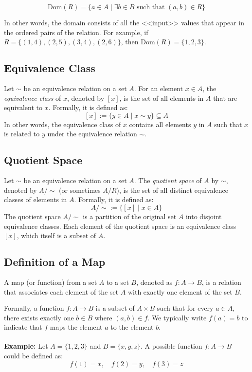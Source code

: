 \[\text{Dom}(R) = \{a \in A \mid \exists b \in B \text{ such that } (a,b) \in R\}\]

In other words, the domain consists of all the <<input>> values that appear in the ordered pairs of the relation. For example, if \(R = \{(1,4), (2,5), (3,4), (2,6)\}\), then \(\text{Dom}(R) = \{1, 2, 3\}\).

\subsection{Equivalence Class}

Let \(\sim\) be an equivalence relation on a set \(A\). For an element \(x \in A\), the \emph{equivalence class} of \(x\), denoted by \([x]\), is the set of all elements in \(A\) that are equivalent to \(x\). Formally, it is defined as:
\[[x] := \{y \in A \mid x \sim y\} \subseteq A\]
In other words, the equivalence class of \(x\) contains all elements \(y\) in \(A\) such that \(x\) is related to \(y\) under the equivalence relation \(\sim\).

\subsection{Quotient Space}

Let \(\sim\) be an equivalence relation on a set \(A\). The \emph{quotient space} of \(A\) by \(\sim\), denoted by \(A/\sim\) (or sometimes \(A/R\)), is the set of all distinct equivalence classes of elements in \(A\). Formally, it is defined as:
\[A/\sim := \{[x] \mid x \in A\}\]
The quotient space \(A/\sim\) is a partition of the original set \(A\) into disjoint equivalence classes. Each element of the quotient space is an equivalence class \([x]\), which itself is a subset of \(A\).

\subsection{Definition of a Map}
A map (or function) from a set \(A\) to a set \(B\), denoted as \(f: A \to B\), is a relation that associates each element of the set \(A\) with exactly one element of the set \(B\).

Formally, a function \(f: A \to B\) is a subset of \(A \times B\) such that for every \(a \in A\), there exists exactly one \(b \in B\) where \((a,b) \in f\). We typically write \(f(a) = b\) to indicate that \(f\) maps the element \(a\) to the element \(b\).
\\\\
\textbf{Example:} Let \(A = \{1, 2, 3\}\) and \(B = \{x, y, z\}\). A possible function \(f: A \to B\) could be defined as:
\[
	f(1) = x, \quad f(2) = y, \quad f(3) = z
\]

